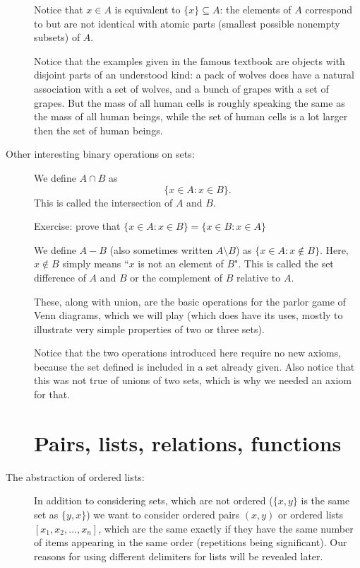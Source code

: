 \documentclass[12pt]{article}
\begin{document}
\begin{description}
Notice that $x \in A$ is equivalent to $\{x\} \subseteq A$:  the elements of $A$ correspond to but are not identical with atomic parts (smallest possible nonempty subsets) of $A$.

Notice that the examples given in the famous textbook are objects with disjoint parts of an understood kind:  a pack of wolves does have a natural association with a set of wolves, and a bunch of grapes with a set of grapes.   But the mass of all human cells is roughly speaking the same as the mass of all human beings, while the set of human cells is a lot larger then the set of human beings.




\item[Other interesting binary operations on sets:]

We define $A \cap B$ as $$\{x \in A:x \in B\}.$$  This is called the intersection of $A$ and $B$.

Exercise:  prove that $\{x \in A:x \in B\} = \{x \in B:x \in A\}$

We define $A - B$ (also sometimes written $A \setminus B$) as $\{x \in A:x \not\in B\}$.  Here, $x \not\in B$ simply means ``$x$ is not an element of $B$".
This is called the set difference of $A$ and $B$ or the complement of $B$ relative to $A$.

These, along with union, are the basic operations for the parlor game of Venn diagrams, which we will play (which does have its uses, mostly to illustrate very simple properties of two or three sets).

Notice that the two operations introduced here require no new axioms, because the set defined is included in a set already given.  Also notice that this was not true of unions of two sets, which is why we needed an axiom for that.

\newpage

\section{Pairs, lists, relations, functions}


\item[The abstraction of ordered lists:]

In addition to considering sets, which are not ordered ($\{x,y\}$ is the same set as $\{y,x\}$) we want to consider
ordered pairs $(x,y)$ or ordered lists $[x_1,x_2,\ldots,x_n]$, which are the same exactly if they have the same number of items appearing in the same order (repetitions being significant).  Our reasons for using different delimiters for lists will be revealed later.


\end{description}
\end{document}

